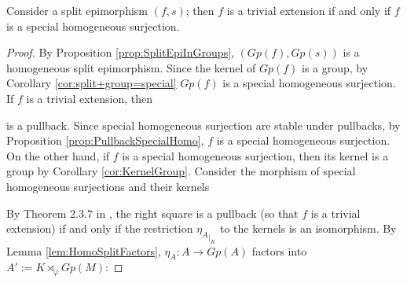 \begin{theorem}
\label{thm:TrivialSplit=SpecialHomo}
    Consider a split epimorphism $(f,s)$; then $f$ is a trivial extension if and only if $f$ is a special homogeneous surjection.
    \begin{proof}
        By Proposition \ref{prop:SplitEpiInGroups}, $(Gp(f),Gp(s))$ is a homogeneous split epimorphism. Since the kernel of $Gp(f)$ is a group, by Corollary \ref{cor:split+group=special} $Gp(f)$ is a special homogeneous surjection. If $f$ is a trivial extension, then
        \begin{center}
        \end{center}
        is a pullback. Since special homogeneous surjection are stable under pullbacks, by Proposition \ref{prop:PullbackSpecialHomo}, $f$ is a special homogeneous surjection. On the other hand, if $f$ is a special homogeneous surjection, then its kernel is a group by Corollary \ref{cor:KernelGroup}. Consider the morphism of special homogeneous surjections and their kernels
        \begin{center}
        \end{center}
        By Theorem $2.3.7$ in \cite{bourn2014schreierSemirings}, the right square is a pullback (so that $f$ is a trivial extension) if and only if the restriction ${\eta_A}_{|_K}$ to the kernels is an isomorphism. By Lemma \ref{lem:HomoSplitFactors}, $\eta_A:A\to Gp(A)$ factors into $A':=K\rtimes_{\overline{\varphi}}Gp(M)$:

\end{proof}
\end{theorem}
